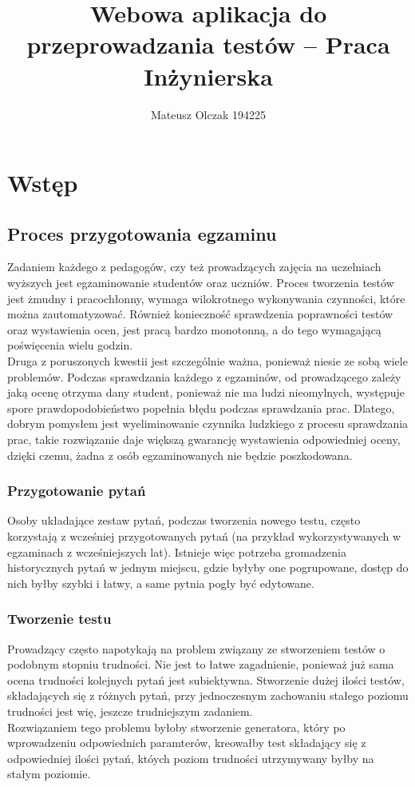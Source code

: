 \documentclass[a4paper, titlepage]{article}
\title{Webowa aplikacja do przeprowadzania testów -- Praca Inżynierska}
\author{Mateusz Olczak 194225}
\begin{document}
\maketitle

\newpage
\tableofcontents

\newpage
\section{Wstęp}

\subsection{Proces przygotowania egzaminu}
Zadaniem każdego z pedagogów, czy też prowadzących zajęcia na uczelniach wyższych jest egzaminowanie studentów oraz uczniów. Proces tworzenia testów jest żmudny i pracochłonny, wymaga wilokrotnego wykonywania czynności, które można zautomatyzować. 
Również konieczność sprawdzenia poprawności testów oraz wystawienia ocen, jest pracą bardzo monotonną, a do tego wymagającą poświęcenia wielu godzin.
\\Druga z poruszonych kwestii jest szczególnie ważna, ponieważ niesie ze sobą wiele problemów. 
Podczas sprawdzania każdego z egzaminów, od prowadzącego zależy jaką ocenę otrzyma dany student, ponieważ nie ma ludzi nieomylnych, występuje spore prawdopodobieństwo popełnia błędu podczas sprawdzania prac. Dlatego, dobrym pomysłem jest wyeliminowanie czynnika ludzkiego z procesu sprawdzania prac, takie rozwiązanie daje większą gwarancję wystawienia odpowiedniej oceny, dzięki czemu, żadna z osób egzaminowanych nie będzie poszkodowana.

\subsubsection{Przygotowanie pytań}
Osoby układające zestaw pytań, podczas tworzenia nowego testu, często korzystają z wcześniej przygotowanych pytań (na przykład wykorzystywanych w egzaminach z wcześniejszych lat). Istnieje więc potrzeba gromadzenia historycznych pytań w jednym miejscu, gdzie byłyby one pogrupowane, dostęp do nich byłby szybki i łatwy, a same pytnia pogły być edytowane.

\subsubsection{Tworzenie testu}
Prowadzący często napotykają na problem związany ze stworzeniem testów o podobnym stopniu trudności. Nie jest to łatwe zagadnienie, ponieważ już sama ocena trudności kolejnych pytań jest subiektywna. Stworzenie dużej ilości testów, składających się z różnych pytań, przy jednoczesnym zachowaniu stałego poziomu trudności jest wię, jeszcze trudniejszym zadaniem.
\\Rozwiązaniem tego problemu byłoby stworzenie generatora, który po wprowadzeniu odpowiednich paramterów, kreowałby test składający się z odpowiedniej ilości pytań, któych poziom trudności utrzymywany byłby na stałym poziomie.
\end{document}
